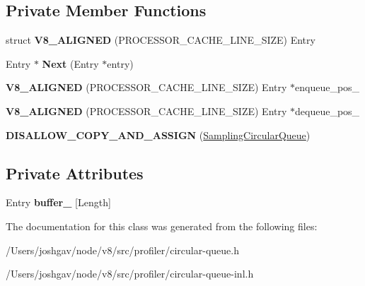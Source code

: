 \subsection*{Private Member Functions}
\begin{DoxyCompactItemize}
\item 
struct {\bfseries V8\+\_\+\+A\+L\+I\+G\+N\+ED} (P\+R\+O\+C\+E\+S\+S\+O\+R\+\_\+\+C\+A\+C\+H\+E\+\_\+\+L\+I\+N\+E\+\_\+\+S\+I\+ZE) Entry\hypertarget{classv8_1_1internal_1_1_sampling_circular_queue_a6929b819f1e84b7d3634b244abb3af63}{}\label{classv8_1_1internal_1_1_sampling_circular_queue_a6929b819f1e84b7d3634b244abb3af63}

\item 
Entry $\ast$ {\bfseries Next} (Entry $\ast$entry)\hypertarget{classv8_1_1internal_1_1_sampling_circular_queue_a73799c9fee0a29d1377e599900bc6486}{}\label{classv8_1_1internal_1_1_sampling_circular_queue_a73799c9fee0a29d1377e599900bc6486}

\item 
{\bfseries V8\+\_\+\+A\+L\+I\+G\+N\+ED} (P\+R\+O\+C\+E\+S\+S\+O\+R\+\_\+\+C\+A\+C\+H\+E\+\_\+\+L\+I\+N\+E\+\_\+\+S\+I\+ZE) Entry $\ast$enqueue\+\_\+pos\+\_\+\hypertarget{classv8_1_1internal_1_1_sampling_circular_queue_a1f45c92b6588ee0157fb49e026c37f7e}{}\label{classv8_1_1internal_1_1_sampling_circular_queue_a1f45c92b6588ee0157fb49e026c37f7e}

\item 
{\bfseries V8\+\_\+\+A\+L\+I\+G\+N\+ED} (P\+R\+O\+C\+E\+S\+S\+O\+R\+\_\+\+C\+A\+C\+H\+E\+\_\+\+L\+I\+N\+E\+\_\+\+S\+I\+ZE) Entry $\ast$dequeue\+\_\+pos\+\_\+\hypertarget{classv8_1_1internal_1_1_sampling_circular_queue_a25f4ab1b175d9b69b3a0f84a763cf5f4}{}\label{classv8_1_1internal_1_1_sampling_circular_queue_a25f4ab1b175d9b69b3a0f84a763cf5f4}

\item 
{\bfseries D\+I\+S\+A\+L\+L\+O\+W\+\_\+\+C\+O\+P\+Y\+\_\+\+A\+N\+D\+\_\+\+A\+S\+S\+I\+GN} (\hyperlink{classv8_1_1internal_1_1_sampling_circular_queue}{Sampling\+Circular\+Queue})\hypertarget{classv8_1_1internal_1_1_sampling_circular_queue_ab5a632f69d2ab40d358e81c3ca8465e5}{}\label{classv8_1_1internal_1_1_sampling_circular_queue_ab5a632f69d2ab40d358e81c3ca8465e5}

\end{DoxyCompactItemize}
\subsection*{Private Attributes}
\begin{DoxyCompactItemize}
\item 
Entry {\bfseries buffer\+\_\+} \mbox{[}Length\mbox{]}\hypertarget{classv8_1_1internal_1_1_sampling_circular_queue_aa52a009056fca25e9ccbbcc2afde3856}{}\label{classv8_1_1internal_1_1_sampling_circular_queue_aa52a009056fca25e9ccbbcc2afde3856}

\end{DoxyCompactItemize}


The documentation for this class was generated from the following files\+:\begin{DoxyCompactItemize}
\item 
/\+Users/joshgav/node/v8/src/profiler/circular-\/queue.\+h\item 
/\+Users/joshgav/node/v8/src/profiler/circular-\/queue-\/inl.\+h\end{DoxyCompactItemize}
